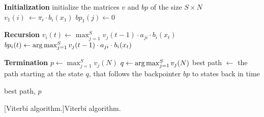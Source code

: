 \begin{algorithm}[ht!]
\begin{algorithmic}[1]

\Statex \textbf{Initialization}
\State initialize the matrices $v$ and $bp$ of the size $S\times N$
	\State $v_1(i)\ \gets \pi_i\cdot b_i(x_1)$
	\State $bp_1(j)\gets 0$
\EndFor

\Statex \textbf{Recursion}
		\State $v_i(t) \gets \max_{j=1}^S v_{j}(t-1)\cdot a_{ji}\cdot b_i(x_t)$
		\State $bp_i(t) \gets \argmax_{j=1}^S v_j(t-1)\cdot a_{ji}\cdot b_i(x_t)$
	\EndFor
\EndFor

\Statex \textbf{Termination}
\State $p \gets \max_{j=1}^S v_j(N)$ 
\State $q \gets \argmax_{j=1}^S v_j(N)$ 
\State best path $\gets$ the path starting at the state $q$, that follows the backpointer $bp$ to states back in time

    \State \Return best path, $p$
\end{algorithmic}
[Viterbi algorithm.]{Viterbi algorithm.}
\end{algorithm}
